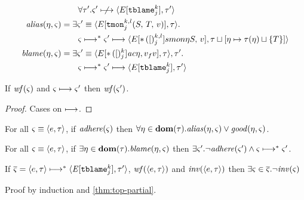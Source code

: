 {\begin{align*}
                            &\qquad \forall \mTMons'. \mstate' \centernot\machstep \chevron{E[\stblame{k}{j}], \mTMons'} \\
 \alias(\mtimeline, \mstate) &= \exists \mstate'\equiv\chevron{E[\sTMon{k}{l}{j}{\mscon}{\mtcon}{\mval}], \mTMons}. \\
                           &\qquad\mstate \machstep^* \mstate' \machstep \chevron{E[\sSMon{k}{l}{j}{\mtimeline}{\mscon}{\mval}], \mTMons\sqcup[\mtimeline \mapsto \mTMons(\mtimeline) \sqcup \setof{\mtcon}]} \\
 \blame(\mtimeline, \mstate) &= \exists \mstate'\equiv\chevron{E[\scev{k}{j}{\mtimeline}{\mval_f}{\mval}], \mTMons}, \mTMons'. \\
                             &\qquad\mstate \machstep^* \mstate' \machstep \chevron{E[\stblame{k}{j}], \mTMons'} \\
\end{align*}
%
\begin{lemma}\label{lem:wf}
  If $\wf(\mstate)$ and $\mstate \machstep \mstate'$ then $\wf(\mstate')$.
\end{lemma}
\begin{proof}
  Cases on $\machstep$.
\end{proof}
%
\begin{lemma}
  For all $\mstate\equiv\chevron{\mexp, \mTMons}$,
  if $\adhere(\mstate)$ then
  $\forall \mtimeline \in \dom(\mTMons). \alias(\mtimeline, \mstate) \vee \good(\mtimeline,\mstate)$.
\end{lemma}
%
\begin{lemma}
  For all $\mstate\equiv\chevron{\mexp, \mTMons}$,
  if $\exists \mtimeline \in \dom(\mTMons). \blame(\mtimeline,\mstate)$ then
  $\exists \mstate'. \neg\adhere(\mstate') \wedge \mstate \machstep^* \mstate'$.
\end{lemma}
%
\begin{theorem}
  If $\overline{\mstate} = \chevron{\mexp,\mTMons} \machstep^* \chevron{\mctx{\mmlab^\prime}[\stblame{k}{j}], \mTMons'}$, $\wf(\chevron{\mexp,\mTMons})$ and $\inv(\chevron{\mexp, \mTMons})$ then $\exists \mstate \in \overline{\mstate}.\neg\inv(\mstate)$
\end{theorem}
Proof by induction and \autoref{thm:top-partial}.
}
